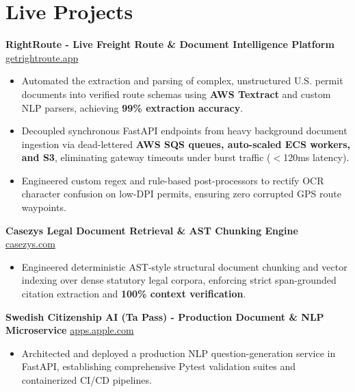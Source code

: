\documentclass[9.5pt,a4paper]{article}
\begin{document}
\section*{Live Projects}
\noindent
\textbf{RightRoute - Live Freight Route \& Document Intelligence Platform} \hfill \href{https://getrightroute.app}{getrightroute.app}
\begin{itemize}
    \item Automated the extraction and parsing of complex, unstructured U.S. permit documents into verified route schemas using \textbf{AWS Textract} and custom NLP parsers, achieving \textbf{99\% extraction accuracy}.
    \item Decoupled synchronous FastAPI endpoints from heavy background document ingestion via dead-lettered \textbf{AWS SQS queues, auto-scaled ECS workers, and S3}, eliminating gateway timeouts under burst traffic ($<$120ms latency).
    \item Engineered custom regex and rule-based post-processors to rectify OCR character confusion on low-DPI permits, ensuring zero corrupted GPS route waypoints.
\end{itemize}
\vspace{0.6pt}
\noindent
\textbf{Casezys Legal Document Retrieval \& AST Chunking Engine} \hfill \href{https://casezys.com}{casezys.com}
\begin{itemize}
    \item Engineered deterministic AST-style structural document chunking and vector indexing over dense statutory legal corpora, enforcing strict span-grounded citation extraction and \textbf{100\% context verification}.
\end{itemize}
\vspace{0.6pt}
\noindent
\textbf{Swedish Citizenship AI (Ta Pass) - Production Document \& NLP Microservice} \hfill \href{https://apps.apple.com/us/app/ta-pass-swedish-citizenship/id6799644651}{apps.apple.com}
\begin{itemize}
    \item Architected and deployed a production NLP question-generation service in FastAPI, establishing comprehensive Pytest validation suites and containerized CI/CD pipelines.
\end{itemize}
\vspace{0.6pt}
\end{document}
